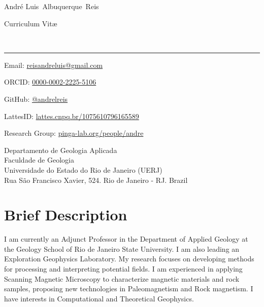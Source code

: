 \documentclass[10pt,a4paper]{article}
\makeatletter
\newcommand{\UERJ}{Universidade do Estado do Rio de Janeiro (UERJ)}
\newcommand{\DGAP}{Departamento de Geologia Aplicada}
\newcommand{\FGEL}{Faculdade de Geologia}
\newcommand{\Title}{Curriculum Vit\ae}
\newcommand{\Firstname}{Andr\'{e} Luis}
\newcommand{\Middlename}{Albuquerque}
\newcommand{\Lastname}{Reis}
\newcommand{\Fullname}{\Firstname\ \Middlename\ \Lastname}
\newcommand{\PersonalEmail}{reisandreluis@gmail.com}
\newcommand{\ResearchGroup}{pinga-lab.org/people/andre}
\newcommand{\GitHubProfile}{@andrelreis}
\newcommand{\ORCID}{0000-0002-2225-5106}
\newcommand{\LattesID}{lattes.cnpq.br/1075610796165589}
\makeatother
\begin{document}
\begin{minipage}[t]{0.5\textwidth}
  {\fontsize{20pt}{0}\selectfont\Fullname}
\end{minipage}
\begin{minipage}[t]{0.5\textwidth}
  \begin{flushright}
    \Title{}
  \end{flushright}
\end{minipage}
\\[-0.1cm]
\textcolor{black}{\rule{\textwidth}{2pt}}
\begin{minipage}[t]{0.5\textwidth}
   \footnotesize \parbox{0.04\textwidth}{\faEnvelope} Email: \href{mailto:\PersonalEmail}{\PersonalEmail}
  \\
  \footnotesize \parbox{0.04\textwidth}{\aiOrcid} ORCID: \href{https://orcid.org/\ORCID}{\ORCID}
  \\
  \footnotesize \parbox{0.04\textwidth}{\faGithub} GitHub: \href{https://github.com/andrelreis}{\GitHubProfile}
  \\
  \footnotesize \parbox{0.04\textwidth}{\aiLattes} LattesID: \href{http://lattes.cnpq.br/1075610796165589}{\LattesID}
  \\
  \footnotesize \parbox{0.04\textwidth}{\faUsers} Research Group: \href{https://www.\ResearchGroup}{\ResearchGroup}
\end{minipage}
\begin{minipage}[t]{0.5\textwidth}
  \begin{flushright}
  \DGAP
  \\
  \FGEL
  \\
  \UERJ
  \\
   Rua São Francisco Xavier, 524. Rio de Janeiro - RJ. Brazil
  \end{flushright}
\end{minipage}

\vspace{0.3cm}

\section{Brief Description}
\vspace{0.3cm}
I am currently an Adjunct Professor in the Department of Applied Geology at the Geology School of Rio de Janeiro State University. I am also leading an Exploration Geophysics Laboratory. My research focuses on developing methods for processing and interpreting potential fields. I am experienced in applying Scanning Magnetic Microscopy to characterize magnetic materials and rock samples, proposing new technologies in Paleomagnetism and Rock magnetism. I have interests in Computational and Theoretical Geophysics.
\end{document}
